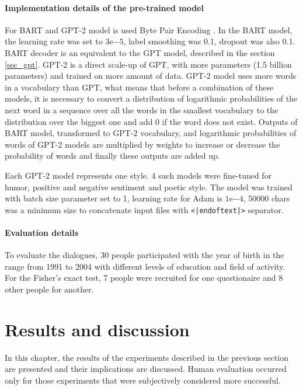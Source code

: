\subsubsection{Implementation details of the pre-trained model}
For BART and GPT-2 model is used Byte Pair Encoding \cite{sennrich2015neural}. In the BART model, the learning rate \cite{jacobs1988increased} was set to $3\mathrm{e}{-5}$, label smoothing \cite{szegedy2016rethinking} was 0.1, dropout was also 0.1. BART decoder is an equivalent to the GPT model, described in the section \ref{sec_gpt}. GPT-2 is a direct scale-up of GPT, with more parameters (1.5 billion parameters) and trained on more amount of data. GPT-2 model uses more words in a vocabulary than GPT, what means that before a combination of these models, it is necessary to convert a distribution of logarithmic probabilities of the next word in a sequence over all the words in the smallest vocabulary to the distribution over the biggest one and add 0 if the word does not exist. Outputs of BART model, transformed to GPT-2 vocabulary, and logarithmic probabilities of words of GPT-2 models are multiplied by weights to increase or decrease the probability of words and finally these outputs are added up.

Each GPT-2 model represents one style. 4 such models were fine-tuned for humor, positive and negative sentiment and poetic style. The model was trained with batch size parameter set to 1, learning rate for Adam is $1\mathrm{e}{-4}$, 50000 chars was a minimum size to concatenate input files with \texttt{<|endoftext|>} separator. 

\subsubsection{Evaluation details}
To evaluate the dialogues, 30 people participated with the year of birth in the range from 1991 to 2004 with different levels of education and field of activity. For the Fisher's exact test, 7 people were recruited for one questionaire and 8 other people for another. 

\chapter{Results and discussion} \label{results_discuss}
In this chapter, the results of the experiments described in the previous section are presented and their implications are discussed. Human evaluation occurred only for those experiments that were subjectively considered more successful.

